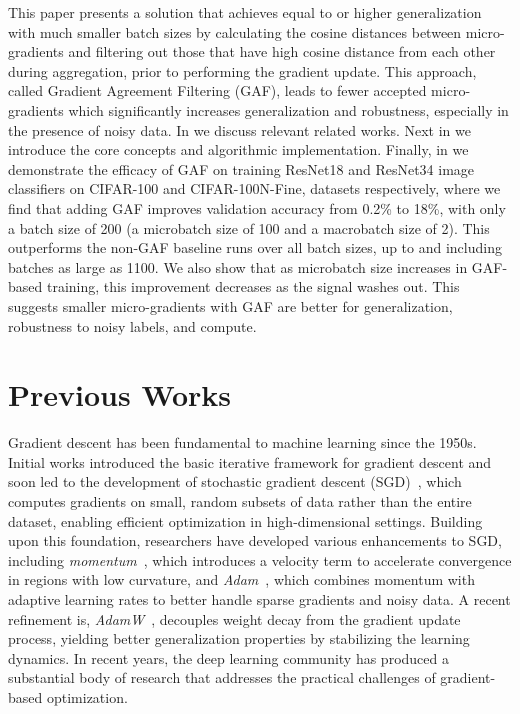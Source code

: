 This paper presents a solution that achieves equal to or higher generalization with much smaller batch sizes by calculating the cosine distances between micro-gradients and filtering out those that have high cosine distance from each other during aggregation, prior to performing the gradient update. This approach, called Gradient Agreement Filtering (GAF), leads to fewer accepted micro-gradients which significantly increases generalization and robustness, especially in the presence of noisy data. In  we discuss relevant related works. Next in  we introduce the core concepts and algorithmic implementation. Finally, in  we demonstrate the efficacy of GAF on training ResNet18 and ResNet34 image classifiers on CIFAR-100 and CIFAR-100N-Fine, datasets respectively, where we find that adding GAF improves validation accuracy from 0.2\% to 18\%, with only a batch size of 200 (a microbatch size of 100 and a macrobatch size of 2). This outperforms the non-GAF baseline runs over all batch sizes, up to and including batches as large as 1100. We also show that as microbatch size increases in GAF-based training, this improvement decreases as the signal washes out. This suggests smaller micro-gradients with GAF are better for generalization, robustness to noisy labels, and compute.


\section{Previous Works}
\label{sec:prior_work}

Gradient descent has been fundamental to machine learning since the 1950s. Initial works introduced the basic iterative framework for gradient descent and soon led to the development of stochastic gradient descent (SGD)~\cite{robbins1951sgd}, which computes gradients on small, random subsets of data rather than the entire dataset, enabling efficient optimization in high-dimensional settings. Building upon this foundation, researchers have developed various enhancements to SGD, including \textit{momentum}~\cite{polyak1964some}, which introduces a velocity term to accelerate convergence in regions with low curvature, and \textit{Adam}~\cite{kingma2014adam}, which combines momentum with adaptive learning rates to better handle sparse gradients and noisy data. A recent refinement is, \textit{AdamW}~\cite{loshchilov2017decoupled}, decouples weight decay from the gradient update process, yielding better generalization properties by stabilizing the learning dynamics. In recent years, the deep learning community has produced a substantial body of research that addresses the practical challenges of gradient-based optimization.

